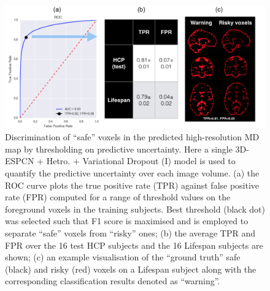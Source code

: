 
\begin{figure}[t] 
	\centering
	\includegraphics[width=0.9\linewidth]{chapter_3/figures/fig_5_6.png}
	\small
	\caption{\footnotesize Discrimination of ``safe'' voxels in the predicted high-resolution MD map by thresholding on predictive uncertainty. Here a single 3D-ESPCN + Hetro. + Variational Dropout (I) model is used to quantify the predictive uncertainty over each image volume. (a) the ROC curve plots the true positive rate (TPR) against false positive rate (FPR) computed  for a range of threshold values on the foreground voxels in the training subjects. Best threshold (black dot) was selected such that F1 score is maximised and is employed to separate ``safe'' voxels from ``risky'' ones; (b) the average TPR and FPR over the 16 test HCP subjects and the 16 Lifespan subjects are shown; (c) an example visualisation of the ``ground truth'' safe (black) and risky (red) voxels on a Lifespan subject along with the corresponding classification results denoted as ``warning''. } 
	
	
	\label{fig:roc}
\end{figure}


